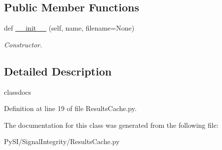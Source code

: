 \subsection*{Public Member Functions}
\begin{DoxyCompactItemize}
\item 
\mbox{\label{classSignalIntegrity_1_1ResultsCache_1_1ResultsCache_a19e3e370f701435403ddb078f27f1ecb}} 
def \hyperlink{classSignalIntegrity_1_1ResultsCache_1_1ResultsCache_a19e3e370f701435403ddb078f27f1ecb}{\+\_\+\+\_\+init\+\_\+\+\_\+} (self, name, filename=None)
\begin{DoxyCompactList}\small\item\em Constructor. \end{DoxyCompactList}\end{DoxyCompactItemize}


\subsection{Detailed Description}
classdocs 

Definition at line 19 of file Results\+Cache.\+py.



The documentation for this class was generated from the following file\+:\begin{DoxyCompactItemize}
\item 
Py\+S\+I/\+Signal\+Integrity/Results\+Cache.\+py\end{DoxyCompactItemize}
